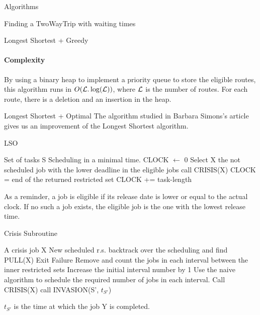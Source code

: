 \documentclass[a4paper,10pt]{report}
\begin{document}
\begin{chapter}{Algorithms}
\begin{section}{Finding a TwoWayTrip with waiting times}
\begin{subsection}{Longest Shortest + Greedy}
\paragraph{Complexity}
By using a binary heap to implement a priority queue to store the eligible routes, this algorithm runs in $O({\cal L}.\log({\cal L}))$, 
where ${\cal L}$ is the number of routes. For each route, there is a deletion and an insertion in the heap.
\end{subsection}

\begin{subsection}{Longest Shortest + Optimal}
 The algorithm studied in Barbara Simons's article \cite{simons1978fast} gives us an improvement of the Longest Shortest algorithm.
 \begin{algorithm}[H]
\caption{LSO}
\begin{algorithmic}
\REQUIRE Set of tasks S
\ENSURE Scheduling in a minimal time.
\STATE CLOCK $\leftarrow$ 0
\STATE Select X the not scheduled job with the lower deadline in the eligible jobs
\STATE call CRISIS(X)
\STATE CLOCK = end of the returned restricted set
\ELSE
\STATE CLOCK += task-length
\ENDIF

\ENDWHILE

\end{algorithmic}
\end{algorithm}
As a reminder, a job is eligible if its release date is lower or equal to the actual clock. If no such a job exists, the eligible job is the one
with the lowest release time.

 \begin{algorithm}[H]
\caption{Crisis Subroutine}
\begin{algorithmic}
\REQUIRE A crisis job X
\ENSURE New scheduled r.s.
\STATE backtrack over the scheduling and find PULL(X)
\STATE Exit Failure
\ENDIF 
\STATE Remove and count the jobs in each interval between the inner restricted sets
\STATE Increase the initial interval number by 1
\STATE Use the naive algorithm to schedule the required number of jobs in each interval.
\STATE Call CRISIS(X)
\ELSE
{}
\STATE call INVASION(S', $t_{S'}$)
\ENDIF
\ENDIF
\ENDWHILE

\end{algorithmic}
\end{algorithm}
$t_{S'}$ is the time at which the job Y is completed.



\end{subsection}
\end{section}
\end{chapter}
\end{document}
